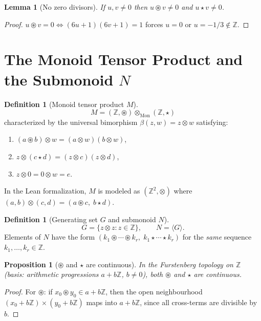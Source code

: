 \documentclass[12pt,a4paper]{amsart}
\theoremstyle{plain}
\newtheorem{lemma}[theorem]{Lemma}
\newtheorem{proposition}[theorem]{Proposition}
\theoremstyle{definition}
\newtheorem{definition}[theorem]{Definition}
\theoremstyle{remark}
\newcommand{\circstar}{\mathbin{\circledast}}
\newcommand{\bstar}{\mathbin{\star}}
\newcommand{\otimesmon}{\otimes_{\mathrm{Mon}}}
\newcommand{\bbZ}{\mathbb{Z}}
\begin{document}
\begin{lemma}[No zero divisors]
\label{lem:nozd}
If $u, v \neq 0$ then $u \circstar v \neq 0$ and $u \bstar v \neq 0$.
\end{lemma}
\begin{proof}
$u \circstar v = 0 \iff (6u+1)(6v+1) = 1$ forces $u = 0$ or
$u = -1/3 \notin \bbZ$.
\end{proof}

\section{The Monoid Tensor Product and the Submonoid $N$}

\begin{definition}[Monoid tensor product $M$]
$$M = (\bbZ, \circstar) \otimesmon (\bbZ, \bstar)$$
characterized by the universal bimorphism $\beta(z, w) = z \otimes w$
satisfying:
\begin{enumerate}[label=(\arabic*),nosep]
  \item $(a \circstar b) \otimes w = (a \otimes w)(b \otimes w)$,
  \item $z \otimes (c \bstar d) = (z \otimes c)(z \otimes d)$,
  \item $z \otimes 0 = 0 \otimes w = e$.
\end{enumerate}
In the Lean formalization, $M$ is modeled as $(\bbZ^2, \otimes)$ where
$(a,b) \otimes (c,d) = (a \circstar c,\; b \bstar d)$.
\end{definition}

\begin{definition}[Generating set $G$ and submonoid $N$]
$$G = \{z \otimes z : z \in \bbZ\}, \qquad N = \langle G \rangle.$$
Elements of $N$ have the form
$(k_1 \circstar \cdots \circstar k_r,\; k_1 \bstar \cdots \bstar k_r)$
for the \emph{same} sequence $k_1, \ldots, k_r \in \bbZ$.
\end{definition}

\begin{proposition}[$\circstar$ and $\bstar$ are continuous]
In the Furstenberg topology on $\bbZ$ (basis: arithmetic progressions
$a + b\bbZ$, $b \neq 0$), both $\circstar$ and $\bstar$ are continuous.
\end{proposition}
\begin{proof}
For $\circstar$: if $x_0 \circstar y_0 \in a + b\bbZ$, then the open
neighbourhood $(x_0 + b\bbZ) \times (y_0 + b\bbZ)$ maps into $a + b\bbZ$,
since all cross-terms are divisible by $b$.
\end{proof}
\end{document}
